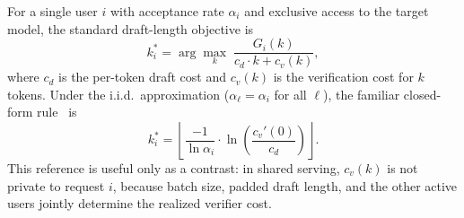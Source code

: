 \documentclass[10pt,journal,onecolumn]{IEEEtran}
\begin{document}
For a single user $i$ with acceptance rate $\alpha_i$ and exclusive
access to the target model, the standard draft-length objective is
\begin{equation}
    \label{eq:single-opt}
    k_i^* = \arg\max_{k} \;
    \frac{G_i(k)}{c_d \cdot k + c_v(k)},
\end{equation}
where $c_d$ is the per-token draft cost and $c_v(k)$ is the
verification cost for $k$ tokens. Under the i.i.d.\ approximation
($\alpha_\ell=\alpha_i$ for all $\ell$), the familiar closed-form
rule~\cite{leviathan2023fast,xia2024unlocking} is
\begin{equation}
    \label{eq:single-opt-closed}
    k_i^* =
    \left\lfloor
    \frac{-1}{\ln \alpha_i}
    \cdot \ln\!\left(\frac{c_v'(0)}{c_d}\right)
    \right\rfloor .
\end{equation}
This reference is useful only as a contrast: in shared serving,
$c_v(k)$ is not private to request $i$, because batch size, padded
draft length, and the other active users jointly determine the
realized verifier cost.
\end{document}
